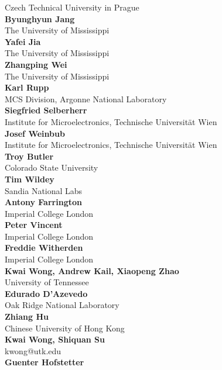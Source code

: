 \documentclass[article,A4,11pt]{llncs}%
\begin{document}
    Czech Technical University in Prague\\
        \noindent
    {\bf Byunghyun Jang}\\
    The University of Mississippi\\
        \noindent
    {\bf Yafei Jia}\\
    The University of Mississippi\\
        \noindent
    {\bf Zhangping Wei}\\
    The University of Mississippi\\
        \noindent
    {\bf Karl Rupp}\\
    MCS Division, Argonne National Laboratory\\
        \noindent
    {\bf Siegfried Selberherr}\\
    Institute for Microelectronics, Technische Universität Wien\\
        \noindent
    {\bf Josef Weinbub}\\
    Institute for Microelectronics, Technische Universität Wien\\
        \noindent
    {\bf Troy Butler}\\
    Colorado State University\\
        \noindent
    {\bf Tim Wildey}\\
    Sandia National Labs\\
        \noindent
    {\bf Antony Farrington}\\
    Imperial College London\\
        \noindent
    {\bf Peter Vincent}\\
    Imperial College London\\
        \noindent
    {\bf Freddie Witherden}\\
    Imperial College London\\
        \noindent
    {\bf Kwai Wong, Andrew Kail, Xiaopeng Zhao}\\
    University of Tennessee\\
        \noindent
    {\bf Edurado D'Azevedo}\\
    Oak Ridge National Laboratory\\
        \noindent
    {\bf Zhiang Hu}\\
    Chinese University of Hong Kong\\
        \noindent
    {\bf Kwai Wong, Shiquan Su}\\
    kwong@utk.edu\\
        \noindent
    {\bf Guenter Hofstetter}\\
\end{document}
